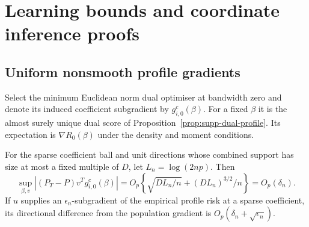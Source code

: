 \section{Learning bounds and coordinate inference proofs}\label{supp:proofs}

\subsection{Uniform nonsmooth profile gradients}

Select the minimum Euclidean norm dual optimiser at bandwidth zero
and denote its induced coefficient subgradient by $g_{i,0}^{c}(\beta)$.
For a fixed $\beta$ it is the almost surely unique dual score of
Proposition~\ref{prop:supp-dual-profile}. Its expectation is
$\nabla R_0(\beta)$ under the density and moment conditions.

\begin{lemma}\label{lem:supp-gradient}
For the sparse coefficient ball and unit directions whose combined
support has size at most a fixed multiple of $D$, let $L_n=\log(2np)$.
Then
\begin{equation}\label{eq:supp-gradient-rate}
 \sup_{\beta,v}|(P_T-P)v^Tg_{i,0}^{c}(\beta)|
   =O_p\!\left\{\sqrt{D L_n/n}+(D L_n)^{3/2}/n\right\}
   =O_p(\delta_n).
\end{equation}
If $u$ supplies an $\epsilon_n$-subgradient of the empirical profile
risk at a sparse coefficient, its directional difference from the
population gradient is $O_p(\delta_n+\sqrt{\epsilon_n})$.
\end{lemma}

